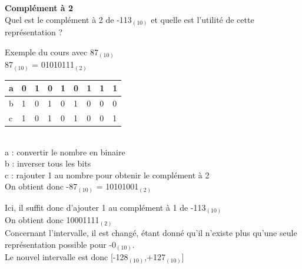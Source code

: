 \begin{Exercice}[5 minutes] \textbf{Complément à 2}\\
    Quel est le complément à 2 de -113$_{(10)}$ et quelle est l'utilité de cette représentation ? \\

    \begin{conseil}
    
    Exemple du cours avec 87$_{(10)}$ \\
    
    87$_{(10)}$ = 01010111$_{(2)}$ \\
    
         \begin{tabular}{| p{1cm} | p{1cm} | p{1cm} | p{1cm} | p{1cm} | p{1cm} | p{1cm} | p{1cm} | p{1cm} |} 
            \hline
            a & 0 & 1 & 0 & 1 & 0 & 1 & 1 & 1 \\ [0.5ex] 
            \hline
            b & 1 & 0 & 1 & 0 & 1 & 0 & 0 & 0 \\ [0.5ex]
            \hline
            c & 1 & 0 & 1 & 0 & 1 & 0 & 0 & 1 \\ [0.5ex]
            \hline
        \end{tabular} \\
        
        a : convertir le nombre en binaire \\
        
        b : inverser tous les bits \\
        
        c : rajouter 1 au nombre pour obtenir le complément à 2 \\
        
        On obtient donc -87$_{(10)}$ = 10101001$_{(2)}$ \\
    \end{conseil}
    
    \begin{solution}
    	Ici, il suffit donc d'ajouter 1 au complément à 1 de -113$_{(10)}$ \\
    	
    	On obtient donc 10001111$_{(2)}$ \\
    	
    	Concernant l'intervalle, il est changé, étant donné qu'il n'existe plus qu'une seule représentation possible pour -0$_{(10)}$. \\
    	
    	Le nouvel intervalle est donc [-128$_{(10)}$,+127$_{(10)}$]
        
    \end{solution}
\end{Exercice}

